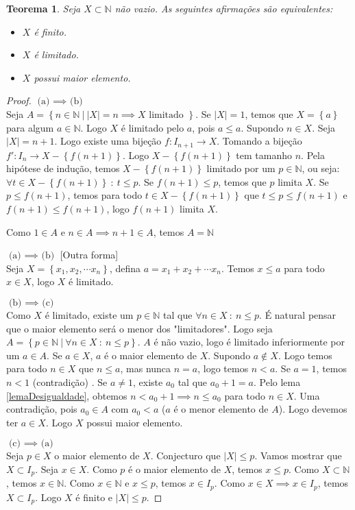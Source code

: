 \documentclass{article}
\theoremstyle{theorem}
\newtheorem{teo}{Teorema}
\theoremstyle{lemma}
\theoremstyle{definition}
\theoremstyle{remark}
\begin{document}
\begin{teo}
	Seja $X\subset \mathbb{N}$ não vazio. As seguintes afirmações são equivalentes:
	\begin{itemize}
		\item $X$ é finito.
		\item $X$ é limitado.
		\item $X$ possui maior elemento.
	\end{itemize}
\end{teo}
\begin{proof}
	$\text{(a) } \implies \text{ (b)}$ \\

	Seja $A = \left\{ n\in \mathbb{N} \: | \:  |X| = n \implies X \text{ limitado } \right\}$. Se $|X| = 1$, temos que $X =\left\{a\right\}$ para algum $a\in \mathbb{N}$. Logo $X$ é limitado pelo $a$, pois $a\leq a$. Supondo $n\in X$.  Seja $|X| = n+1$. Logo existe uma bijeção $f: I_{n+1} \to X$. Tomando a bijeção $f':I_n \to X-\left\{f(n+1)\right\}$. Logo $X-\left\{f(n+1)\right\}$ tem tamanho $n$. Pela hipótese de indução, temos $X - \left\{ f(n+1)\right\}$ limitado por um $p \in \mathbb{N}$, ou seja: $\forall t\in X - \left\{f(n+1) \right\} \: : \: t\leq p $. Se $f(n+1) \leq p$, temos que $p$ limita $X$. Se $p\leq f(n+1)$, temos para todo $t\in X - \left\{ f(n+1) \right\}$ que $t\leq p \leq f(n+1)$ e $f(n+1)\leq f(n+1)$, logo $f(n+1)$ limita $X$.

	Como $1\in A$ e $n \in A \implies n+1\in A$, temos $A = \mathbb{N}$


	$\text{(a) } \implies \text{ (b)}$ [Outra forma] \\
	Seja $X = \left\{x_1,x_2,\cdots x_n \right\}$, defina $a = x_1+x_2+\cdots x_n$. Temos $x\leq a $ para todo $x\in X$, logo $X$ é limitado.
	

	$\text{(b) } \implies \text{ (c)}$ \\

	Como $X$ é limitado, existe um $p\in \mathbb{N}$ tal que $\forall n \in X \: : \: n \leq p$. É natural pensar que o maior elemento será o menor dos "limitadores". Logo seja $A = \left\{ p \in \mathbb{N} \: | \: \forall n \in X \: : \: n\leq p \right\}$. $A$ é não vazio, logo é limitado inferiormente por um $a\in A$. Se $a\in X$, $a$ é o maior elemento de $X$.  Supondo $a\not \in X$. Logo temos para todo $n\in X$ que  $n \leq a$, mas nunca  $n = a$, logo temos $n < a$. Se $a = 1$, temos $n<1$ (contradição) . Se $a \neq 1$, existe $a_0$ tal que $a_0 + 1 = a$. Pelo lema \ref{lemaDesigualdade}, obtemos $n < a_0+1 \implies n \leq a_0$ para todo $n\in X$. Uma contradição, pois $a_0\in A$ com $a_0 < a$ ($a$ é o menor elemento de $A$).  Logo devemos ter $a\in X$. Logo $X$ possui maior elemento.

	$\text{(c) } \implies \text{ (a)}$ \\

	Seja $p\in X$ o maior elemento de $X$. Conjecturo que $|X| \leq p$.  Vamos mostrar que $X \subset I_p$.  Seja $x\in X$. Como $p$ é o maior elemento de $X$, temos $x\leq p$. Como $X\subset \mathbb{N}$, temos $x\in \mathbb{N}$. Como $x\in \mathbb{N}$ e $x\leq p$, temos $x\in I_p$. Como $x\in X\implies x\in I_p$, temos $X\subset I_p$. Logo $X$ é finito e $|X| \leq  p$.
\end{proof}
\end{document}
